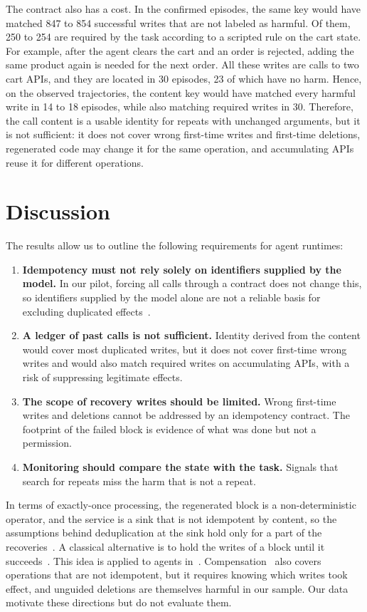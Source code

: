 \documentclass[conference]{IEEEtran}
\begin{document}
The contract also has a cost. In the confirmed episodes, the same key would have matched 847 to 854 successful writes that are not labeled as harmful. Of them, 250 to 254 are required by the task according to a scripted rule on the cart state. For example, after the agent clears the cart and an order is rejected, adding the same product again is needed for the next order. All these writes are calls to two cart APIs, and they are located in 30 episodes, 23 of which have no harm. Hence, on the observed trajectories, the content key would have matched every harmful write in 14 to 18 episodes, while also matching required writes in 30. Therefore, the call content is a usable identity for repeats with unchanged arguments, but it is not sufficient: it does not cover wrong first-time writes and first-time deletions, regenerated code may change it for the same operation, and accumulating APIs reuse it for different operations.

\section{Discussion}\label{sec:discussion}

The results allow us to outline the following requirements for agent runtimes:
\begin{enumerate}
\item \textbf{Idempotency must not rely solely on identifiers supplied by the model.} In our pilot, forcing all calls through a contract does not change this, so identifiers supplied by the model alone are not a reliable basis for excluding duplicated effects~\cite{trofimov2026toolcallssucceedworkflows}.
\item \textbf{A ledger of past calls is not sufficient.} Identity derived from the content would cover most duplicated writes, but it does not cover first-time wrong writes and would also match required writes on accumulating APIs, with a risk of suppressing legitimate effects.
\item \textbf{The scope of recovery writes should be limited.} Wrong first-time writes and deletions cannot be addressed by an idempotency contract. The footprint of the failed block is evidence of what was done but not a permission.
\item \textbf{Monitoring should compare the state with the task.} Signals that search for repeats miss the harm that is not a repeat.
\end{enumerate}

In terms of exactly-once processing, the regenerated block is a non-deterministic operator, and the service is a sink that is not idempotent by content, so the assumptions behind deduplication at the sink hold only for a part of the recoveries~\cite{Akidau:2013:MFS:2536222.2536229}. A classical alternative is to hold the writes of a block until it succeeds~\cite{strom1985optimistic}. This idea is applied to agents in~\cite{chen2026cordon,wang2026forkexplorecommitos}. Compensation~\cite{mohammadi2026atomix,perera2026rac} also covers operations that are not idempotent, but it requires knowing which writes took effect, and unguided deletions are themselves harmful in our sample. Our data motivate these directions but do not evaluate them.
\end{document}
